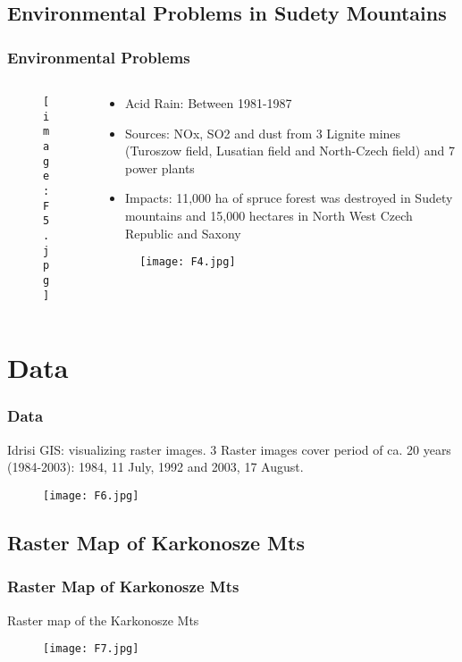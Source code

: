 \documentclass[pdflatex,compress,8pt,
	xcolor={dvipsnames,dvipsnames,svgnames,x11names,table},
	hyperref={
	breaklinks = true, 
	pdfauthor={Lemenkova Polina}, 
	pdfsubject={Preentation}, 
	pdfcreator={Lemenkova Polina}, 
	pdfproducer={Lemenkova Polina}, 
	citecolor=NavyBlue, 
	urlbordercolor=cyan,
	urlcolor = NavyBlue, 
	breaklinks = true}]{beamer}
\begin{document}
\subsection{Environmental Problems in Sudety Mountains} 
\begin{frame}\frametitle{Environmental Problems}
\begin{minipage}[0.4\textheight]{\textwidth}
\begin{columns}[T]
\begin{column}{0.4\textwidth}
\begin{figure}[H]
	\centering
		\texttt{[image: F5.jpg]}
\end{figure}
\end{column}
\begin{column}{0.6\textwidth}
\begin{itemize}
	\item Acid Rain: Between 1981-1987
	\item Sources: NOx, SO2 and dust from 3 Lignite mines (Turoszow field, Lusatian field and North-Czech field) and 7 power plants
	\item Impacts: 11,000 ha of spruce forest was destroyed in Sudety mountains and 15,000 hectares in North West Czech Republic and Saxony
\end{itemize}
\begin{figure}[H]
	\centering
		\texttt{[image: F4.jpg]}
\end{figure}
\end{column}
\end{columns}
\end{minipage}
\end{frame}


\section{Data}
\begin{frame}\frametitle{Data}
Idrisi GIS: visualizing raster images. 3 Raster images cover period of ca. 20 years (1984-2003): 1984, 11 July, 1992 and 2003, 17 August. 
\begin{figure}[H]
	\centering
		\texttt{[image: F6.jpg]}
\end{figure}
\end{frame}

\subsection{Raster Map of Karkonosze Mts}
\begin{frame}\frametitle{Raster Map of Karkonosze Mts}
Raster map of the Karkonosze Mts
\begin{figure}[H]
	\centering
		\texttt{[image: F7.jpg]}
\end{figure}
\end{frame}
\end{document}
